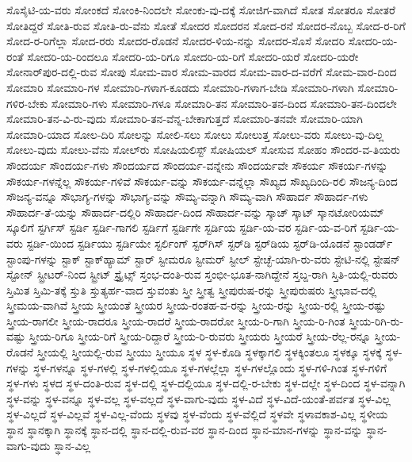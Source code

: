 {ಸೊಸೈಟಿ-ಯ-ವರು
ಸೋಂಕದೆ
ಸೋಂಕಿ-ನಿಂದಲೇ
ಸೋಂಕು-ವು-ದಕ್ಕೆ
ಸೋಜಿಗ-ವಾಗಿದೆ
ಸೋತ
ಸೋತರೂ
ಸೋತರೆ
ಸೋತಿದ್ದರೆ
ಸೋತಿ-ರುವ
ಸೋತಿ-ರು-ವೆನು
ಸೋತೆ
ಸೋದರ
ಸೋದರನ
ಸೋದ-ರನೆ
ಸೋದರ-ನೊಬ್ಬ
ಸೋದ-ರ-ರಿಗೆ
ಸೋದ-ರ-ರಿಗೆಲ್ಲಾ
ಸೋದ-ರರು
ಸೋದರ-ರೊಡನೆ
ಸೋದರ-ಳಿಯ-ನನ್ನು
ಸೋದರ-ಸೊಸೆ
ಸೋದರಿ
ಸೋದರಿ-ಯ-ರಂತೆ
ಸೋದರಿ-ಯ-ರಿಂದಲೂ
ಸೋದರಿ-ಯ-ರಿಗೂ
ಸೋದರಿ-ಯ-ರಿಗೆ
ಸೋದರಿ-ಯರೆ
ಸೋದರಿ-ಯರೇ
ಸೋನಾರ್‌ಪುರ-ದಲ್ಲಿ-ರುವ
ಸೋಪು
ಸೋಮ-ವಾರ
ಸೋಮ-ವಾರದ
ಸೋಮ-ವಾರ-ದ-ವರೆಗೆ
ಸೋಮ-ವಾರ-ದಿಂದ
ಸೋಮಾರಿ
ಸೋಮಾರಿ-ಗಳ
ಸೋಮಾರಿ-ಗಳಾಗ-ಕೂಡದು
ಸೋಮಾರಿ-ಗಳಾಗ-ಬೇಡಿ
ಸೋಮಾರಿ-ಗಳಾಗಿ
ಸೋಮಾರಿ-ಗಳಿರ-ಬೇಕು
ಸೋಮಾರಿ-ಗಳು
ಸೋಮಾರಿ-ಗಳೂ
ಸೋಮಾರಿ-ತನ
ಸೋಮಾರಿ-ತನ-ದಿಂದ
ಸೋಮಾರಿ-ತನ-ದಿಂದಲೇ
ಸೋಮಾರಿ-ತನ-ವಿ-ರು-ವುದು
ಸೋಮಾರಿ-ತನ-ವೆನ್ನ-ಬೇಕಾಗುತ್ತದೆ
ಸೋಮಾರಿ-ತನವೇ
ಸೋಮಾರಿ-ಯಾಗಿ
ಸೋಮಾರಿ-ಯಾದ
ಸೋಲ-ದಿರಿ
ಸೋಲನ್ನು
ಸೋಲಿ-ಸಲು
ಸೋಲು
ಸೋಲುತ್ತ
ಸೋಲು-ವರು
ಸೋಲು-ವು-ದಿಲ್ಲ
ಸೋಲು-ವುದು
ಸೋಲು-ವೆನು
ಸೋಲ್‌ರು
ಸೋಷಿಯಲಿಸ್ಟ್
ಸೋಷಿಯಲ್
ಸೋಸುವ
ಸೋಹಂ
ಸೌಂದರ-ವ-ತಿಯರು
ಸೌಂದರ್ಯ
ಸೌಂದರ್ಯ-ಗಳು
ಸೌಂದರ್ಯದ
ಸೌಂದರ್ಯ-ವನ್ನೇನು
ಸೌಂದರ್ಯವೇ
ಸೌಕರ್ಯ
ಸೌಕರ್ಯ-ಗಳನ್ನು
ಸೌಕರ್ಯ-ಗಳನ್ನೆಲ್ಲ
ಸೌಕರ್ಯ-ಗಳಿವೆ
ಸೌಕರ್ಯ-ವನ್ನು
ಸೌಕರ್ಯ-ವನ್ನೆಲ್ಲಾ
ಸೌಖ್ಯದ
ಸೌಖ್ಯದಿಂದಿ-ರಲಿ
ಸೌಜನ್ಯ-ದಿಂದ
ಸೌಜನ್ಯ-ವನ್ನೂ
ಸೌಭಾಗ್ಯ-ಗಳನ್ನು
ಸೌಭಾಗ್ಯ-ವನ್ನು
ಸೌಮ್ಯ-ವನ್ನಾಗಿ
ಸೌಮ್ಯ-ವಾಗಿ
ಸೌಹಾರ್ದ
ಸೌಹಾರ್ದ-ಗಳು
ಸೌಹಾರ್ದ-ತೆ-ಯನ್ನು
ಸೌಹಾರ್ದ-ದಲ್ಲಿರಿ
ಸೌಹಾರ್ದ-ದಿಂದ
ಸೌಹಾರ್ದ-ವನ್ನು
ಸ್ಕಾಚ್
ಸ್ಕಾಟ್
ಸ್ಕಾನಟೋರಿಯಮ್
ಸ್ಕೂಲಿಗೆ
ಸ್ಟರ್ಗಿಸ್
ಸ್ಟರ್ಡಿ
ಸ್ಟರ್ಡಿ-ಗಾಗಲಿ
ಸ್ಟರ್ಡಿಗೆ
ಸ್ಟರ್ಡಿಗೇ
ಸ್ಟರ್ಡಿಯ
ಸ್ಟರ್ಡಿ-ಯ-ವರ
ಸ್ಟರ್ಡಿ-ಯ-ವ-ರಿಗೆ
ಸ್ಟರ್ಡಿ-ಯ-ವರು
ಸ್ಟರ್ಡಿ-ಯಿಂದ
ಸ್ಟರ್ಡಿಯು
ಸ್ಟರ್ಡಿಯೇ
ಸ್ಟರ್ಲಿಂಗ್
ಸ್ಟರ್‌ಗಿಸ್
ಸ್ಟರ್‌ಡಿ
ಸ್ಟರ್‌ಡಿಯ
ಸ್ಟರ್‌ಡಿ-ಯೊಡನೆ
ಸ್ಟಾಂಡರ್ಡ್
ಸ್ಟಾಂಪು-ಗಳನ್ನು
ಸ್ಟಾಕ್
ಸ್ಟಾಕ್‌ಹ್ಯಾಮ್
ಸ್ಟಾರ್‌
ಸ್ಟೀಮರೂ
ಸ್ಟೀಮರ್
ಸ್ಟೀಲ್
ಸ್ಟೇಚ್ಛೆ-ಯಾಗಿ-ರು-ವರು
ಸ್ಟೇಟಿ-ನಲ್ಲಿ
ಸ್ಟೇಷನ್
ಸ್ಟೋನ್
ಸ್ಟ್ರೀಟರ್‌-ನಿಂದ
ಸ್ಟ್ರೀಟ್
ಸ್ಟ್ರೈಟ್ಸ್
ಸ್ತಂಭ-ದಂತಿ-ರುವ
ಸ್ತಂಭೀ-ಭೂತ-ನಾಗಿದ್ದೇನೆ
ಸ್ತಬ್ದ-ರಾಗಿ
ಸ್ತಿತಿ-ಯಲ್ಲಿ-ರುವರು
ಸ್ತಿಮಿತ
ಸ್ತಿಮಿ-ತಕ್ಕೆ
ಸ್ತುತಿ
ಸ್ತುತ್ಯರ್ಹ-ವಾದ
ಸ್ತುವಂತು
ಸ್ತ್ರೀ
ಸ್ತ್ರೀತ್ವ
ಸ್ತ್ರೀಪುರುಷ-ರನ್ನು
ಸ್ತ್ರೀಪುರುಷರು
ಸ್ತ್ರೀಭಾವ-ದಲ್ಲಿ
ಸ್ತ್ರೀಮಯ-ವಾಗಿವೆ
ಸ್ತ್ರೀಯ
ಸ್ತ್ರೀಯಂತೆ
ಸ್ತ್ರೀಯರ
ಸ್ತ್ರೀಯ-ರಂತಹ-ವ-ರನ್ನು
ಸ್ತ್ರೀಯ-ರನ್ನು
ಸ್ತ್ರೀಯ-ರಲ್ಲಿ
ಸ್ತ್ರೀಯ-ರಷ್ಟು
ಸ್ತ್ರೀಯ-ರಾಗಲೀ
ಸ್ತ್ರೀಯ-ರಾದರೂ
ಸ್ತ್ರೀಯ-ರಾದರೆ
ಸ್ತ್ರೀಯ-ರಾದರೋ
ಸ್ತ್ರೀಯ-ರಿ-ಗಾಗಿ
ಸ್ತ್ರೀಯ-ರಿ-ಗಿಂತ
ಸ್ತ್ರೀಯ-ರಿಗಿ-ರು-ವಷ್ಟು
ಸ್ತ್ರೀಯ-ರಿಗೂ
ಸ್ತ್ರೀಯ-ರಿಗೆ
ಸ್ತ್ರೀಯ-ರಿದ್ದಾರೆ
ಸ್ತ್ರೀಯ-ರಿ-ರುವರು
ಸ್ತ್ರೀಯರು
ಸ್ತ್ರೀಯರೆ
ಸ್ತ್ರೀಯ-ರೆಲ್ಲ-ರನ್ನೂ
ಸ್ತ್ರೀಯ-ರೊಡನೆ
ಸ್ತ್ರೀಯಲ್ಲಿ
ಸ್ತ್ರೀಯಲ್ಲಿ-ರುವ
ಸ್ತ್ರೀಯು
ಸ್ತ್ರೀಯೂ
ಸ್ಥಳ
ಸ್ಥಳ-ಕೊಡಿ
ಸ್ಥಳಕ್ಕಾಗಲಿ
ಸ್ಥಳಕ್ಕಿಂತಲೂ
ಸ್ಥಳಕ್ಕೂ
ಸ್ಥಳಕ್ಕೆ
ಸ್ಥಳ-ಗಳನ್ನು
ಸ್ಥಳ-ಗಳನ್ನೂ
ಸ್ಥಳ-ಗಳಲ್ಲಿ
ಸ್ಥಳ-ಗಳಲ್ಲಿಯೂ
ಸ್ಥಳ-ಗಳಲ್ಲೆಲ್ಲಾ
ಸ್ಥಳ-ಗಳಲ್ಲೊಂದು
ಸ್ಥಳ-ಗಳಿ-ಗಿಂತ
ಸ್ಥಳ-ಗಳಿಗೆ
ಸ್ಥಳ-ಗಳು
ಸ್ಥಳದ
ಸ್ಥಳ-ದಂತಿ-ರುವ
ಸ್ಥಳ-ದಲ್ಲಿ
ಸ್ಥಳ-ದಲ್ಲಿಯೂ
ಸ್ಥಳ-ದಲ್ಲಿ-ರ-ಬೇಕು
ಸ್ಥಳ-ದಲ್ಲೇ
ಸ್ಥಳ-ದಿಂದ
ಸ್ಥಳ-ವನ್ನಾಗಿ
ಸ್ಥಳ-ವನ್ನು
ಸ್ಥಳ-ವನ್ನೂ
ಸ್ಥಳ-ವಲ್ಲ
ಸ್ಥಳ-ವಲ್ಲದೆ
ಸ್ಥಳ-ವಾಗು-ವುದು
ಸ್ಥಳ-ವಿದೆ
ಸ್ಥಳ-ವಿದೆ-ಯಂತೆ-ಪರ್ವತ
ಸ್ಥಳ-ವಿಲ್ಲ
ಸ್ಥಳ-ವಿಲ್ಲದೆ
ಸ್ಥಳ-ವಿಲ್ಲವೆ
ಸ್ಥಳ-ವಿಲ್ಲ-ವೆಂದು
ಸ್ಥಳವು
ಸ್ಥಳ-ವೆಂದು
ಸ್ಥಳ-ವೆಲ್ಲಿದೆ
ಸ್ಥಳವೇ
ಸ್ಥಳಾವಕಾಶ-ವಿಲ್ಲ
ಸ್ಥಳೀಯ
ಸ್ಥಾನ
ಸ್ಥಾನಕ್ಕಾಗಿ
ಸ್ಥಾನಕ್ಕೆ
ಸ್ಥಾನ-ದಲ್ಲಿ
ಸ್ಥಾನ-ದಲ್ಲಿ-ರುವ-ವರ
ಸ್ಥಾನ-ದಿಂದ
ಸ್ಥಾನ-ಮಾನ-ಗಳನ್ನು
ಸ್ಥಾನ-ವನ್ನು
ಸ್ಥಾನ-ವಾಗು-ವುದು
ಸ್ಥಾನ-ವಿಲ್ಲ
}
